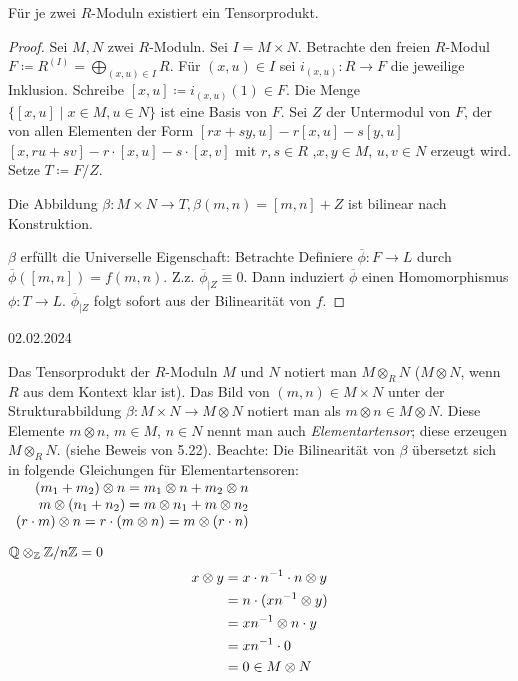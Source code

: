 \documentclass[../main.tex]{subfiles}
\begin{document}
\begin{theorem}
    Für je zwei $R$-Moduln existiert ein Tensorprodukt.
\end{theorem}
\begin{proof}
    Sei $M,N$ zwei $R$-Moduln. Sei $I=M\times N$.
    Betrachte den freien $R$-Modul $F\coloneqq R^{(I)} = \bigoplus_{(x,u)\in I} R$.
    Für $(x,u)\in I$ sei $i_{(x,u)}:R\rightarrow F$ die jeweilige Inklusion.
    Schreibe $[x,u] \coloneqq i_{(x,u)} (1)\in F$.
    Die Menge $\{[x,u]\mid x\in M, u\in N\}$ ist eine Basis von $F$.
    Sei $Z$ der Untermodul von $F$, der von allen Elementen der Form $[rx+sy,u] - r[x,u] - s[y,u]$
    $[x, ru+sv] - r\cdot [x,u] - s\cdot [x,v]$ mit $r,s\in R$ ,$x,y\in M$, $u,v\in N$ erzeugt wird.
    Setze $T\coloneqq F/Z.$

    Die Abbildung $\beta:M\times N \rightarrow T, \beta(m,n) = [m,n]+Z$ ist bilinear nach Konstruktion.

    $\beta$ erfüllt die Universelle Eigenschaft:
    Betrachte 
    Definiere $\overline{\phi}:F\rightarrow L$ durch $\overline{\phi} ([m,n]) = f(m,n)$.
    Z.z. $\overline{\phi}_{|Z} \equiv 0$. Dann induziert $\overline{\phi}$ einen Homomorphismus $\phi: T\rightarrow L$.
    $\overline{\phi}_{|Z}$ folgt sofort aus der Bilinearität von $f$.
\end{proof}
\begin{flushright}
    02.02.2024
\end{flushright}
\begin{remark}[Notation]
    Das Tensorprodukt der $R$-Moduln $M$ und $N$ notiert man ${M\otimes_R N}$
    ($M\otimes N$, wenn $R$ aus dem Kontext klar ist).
    Das Bild von $(m,n)\in M\times N$ unter der Strukturabbildung $\beta: M\times N \rightarrow M\otimes N$ notiert man als $m\otimes n\in M\otimes N$.
    Diese Elemente $m\otimes n$, $m\in M$, $n\in N$ nennt man auch \emph{Elementartensor}; diese erzeugen $M\otimes_R N$. (siehe Beweis von 5.22).
    Beachte: Die Bilinearität von $\beta$ übersetzt sich in folgende Gleichungen für Elementartensoren:$\begin{array}[t]{r}
(m_1 + m_2)\otimes n = m_1\otimes n + m_2 \otimes n \\
m\otimes (n_1 + n_2)=m\otimes n_1 + m\otimes n_2 \\
(r\cdot m)\otimes n = r\cdot (m\otimes n) = m\otimes (r\cdot n)
\end{array}$
\end{remark}
\begin{example}
    $\mathbb{Q}\otimes_{\mathbb{Z}} \mathbb{Z}/n\mathbb{Z} = 0$
    \begin{align*}
        x\otimes y &= x\cdot n^{-1}\cdot n \otimes y\\
        &= n\cdot (xn^{-1}\otimes y)\\
        &= xn^{-1}\otimes n\cdot y\\
        &= xn^{-1}\cdot 0\\
        &= 0\in M\otimes N
    \end{align*}
\end{example}
\end{document}
